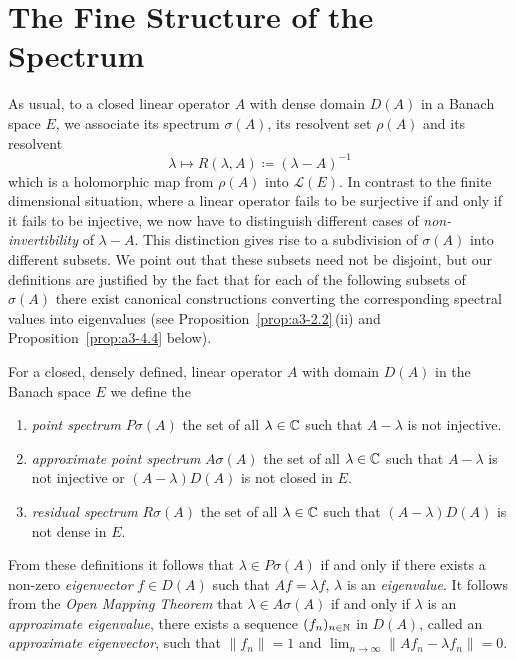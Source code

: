 \section{The Fine Structure of the Spectrum}\label{sec:a3-2}%
As usual, to a closed linear operator $A$ with dense domain $D(A)$ in a Banach space $E$, we associate its spectrum $\sigma(A)$, its resolvent set
$\rho(A)$ and its resolvent 
\[
    \lambda \mapsto R(\lambda,A) \coloneq (\lambda - A)^{-1}
\]
which is a holomorphic map from $\rho(A)$ into $\mathcal{L}(E)$.
In contrast to the finite dimensional situation, where a linear operator fails to be surjective if and only if it fails to be injective, we now have to distinguish different cases of \emph{non-invertibility} of\/ $\lambda - A$.
This distinction gives rise to a subdivision of\/ $\sigma(A)$ into different subsets.
We point out that these subsets need not be disjoint, but our definitions are
justified by the fact that for each of the following subsets of\/ $\sigma(A)$ there exist canonical constructions converting the corresponding spectral values into eigenvalues (see Proposition~\ref{prop:a3-2.2}\,(ii) and Proposition~\ref{prop:a3-4.4} below).
\begin{definition}\label{def:a3-2.1}
For a closed, densely defined, linear operator $A$ with domain $D(A)$ in the Banach space $E$ we define the
\begin{enumerate}[\upshape (i)]
\item 
\emph{point spectrum} $P\sigma(A)$ the set of all $\lambda \in \mathbb{C}$ such that 
$A - \lambda$ is not injective.

\item 
\emph{approximate point spectrum}
$A\sigma(A)$ the set of all $\lambda \in \mathbb{C}$ such that $A - \lambda$ is not injective or $(A - \lambda)D(A)$ is not closed in $E$. 

\item 
\emph{residual spectrum} $R\sigma(A)$ the set of all $\lambda \in \mathbb{C}$ such that $(A - \lambda)D(A)$ is not dense in $E$.
\end{enumerate}
\end{definition}
From these definitions it follows that $\lambda \in P\sigma(A)$ if and only if there exists a non-zero \emph{eigenvector}%
$f \in D(A)$ such that $Af = \lambda f$, \ie $\lambda$ is an \emph{eigenvalue}.
It follows from the \emph{Open Mapping Theorem} that $\lambda \in A\sigma(A)$ if and only if\/ $\lambda$ is an \emph{approximate eigenvalue}, 
\ie there exists a sequence $(f_{n})_{n \in \mathbb{N}}$ in $D(A)$, called an \emph{approximate eigenvector}, 
such that $\|f_{n}\| = 1$ and $ \lim_{n \to \infty} \|Af_{n} - \lambda f_{n}\| = 0$.

